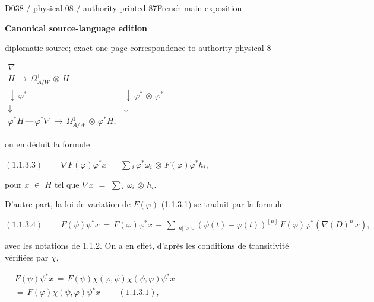 \documentclass[9pt]{article}
\newcommand{\CanonText}[1]{\par{\fontsize{8.0}{9.35}\selectfont\RaggedRight #1\par}\vspace{2.2pt}}
\newcommand{\CanonDisplay}[1]{\par\vspace{1.2pt}\begin{center}{\fontsize{7.2}{8.4}\selectfont\(\displaystyle #1\)}\end{center}\vspace{1.2pt}}
\newenvironment{CanonMathBlock}{\par\vspace{1.2pt}\begin{center}\fontsize{6.8}{8.0}\selectfont\(\displaystyle}{\)\end{center}\vspace{1.2pt}}
\newcommand{\LayerTitle}{Canonical source-language edition}
\begin{document}
\noindent\begin{minipage}[t][\dimexpr\textheight-5pt\relax][t]{\textwidth}
{\sffamily\fontsize{7.3}{8.2}\selectfont\color{Quiet} D038 / physical 08 / authority printed 87\hfill French main exposition}
\par{}\vspace{4.5pt}
{\sffamily\fontsize{10.4}{11.6}\selectfont\bfseries\color{Accent} \LayerTitle}
\par{\sffamily\fontsize{6.7}{7.7}\selectfont\color{Quiet} diplomatic source; exact one-page correspondence to authority physical 8}
\vspace{5pt}
\begin{CanonMathBlock}
\begin{array}{cc}
\nabla{} & {}\\
H\,\longrightarrow{}\,\Omega{}^{1}_{A/W}\,\otimes{}\,H & {}\\
\downarrow{}\,\varphi{}^{*} & \downarrow{}\,\varphi{}^{*}\,\otimes{}\,\varphi{}^{*}\\
\downarrow{} & \downarrow{}\\
\varphi{}^{*}H\,\text{---}\,\varphi{}^{*}\nabla{}\,\longrightarrow{}\,\Omega{}^{1}_{A/W}\,\otimes{}\,\varphi{}^{*}H, & {}
\end{array}
\end{CanonMathBlock}
\CanonText{on en déduit la formule}
\CanonDisplay{(1.1.3.3)\qquad\,\nabla{}F(\varphi{})\varphi{}^{*}x\,=\,\sum{}_{i}\,\varphi{}^{*}\omega{}_{i}\,\otimes{}\,F(\varphi{})\varphi{}^{*}h_{i},}
\CanonText{pour \(x\) \(\in{}\) \(H\) tel que \(\nabla{}x\) \(=\) \(\sum{}_{i}\) \(\omega{}_{i}\) \(\otimes{}\) \(h_{i}\).}
\CanonText{D'autre part, la loi de variation de \(F(\varphi{})\) (1.1.3.1) se traduit par la formule}
\CanonDisplay{(1.1.3.4)\qquad\,F(\psi{})\psi{}^{*}x\,=\,F(\varphi{})\varphi{}^{*}x\,+\,\sum{}_{|n|>0}\,(\psi{}(t)-\varphi{}(t))^{[n]}\,F(\varphi{})\varphi{}^{*}(\nabla{}(D)^{n}\,x),}
\CanonText{avec les notations de 1.1.2. On a en effet, d'après les conditions de transitivité vérifiées par \(\chi{}\),}
\begin{CanonMathBlock}
\begin{aligned}
& F(\psi{})\psi{}^{*}x\,=\,F(\psi{})\chi{}(\varphi{},\psi{})\chi{}(\psi{},\varphi{})\psi{}^{*}x\\
& =\,F(\varphi{})\chi{}(\psi{},\varphi{})\psi{}^{*}x\qquad\,(1.1.3.1),
\end{aligned}
\end{CanonMathBlock}

\end{minipage}
\end{document}

